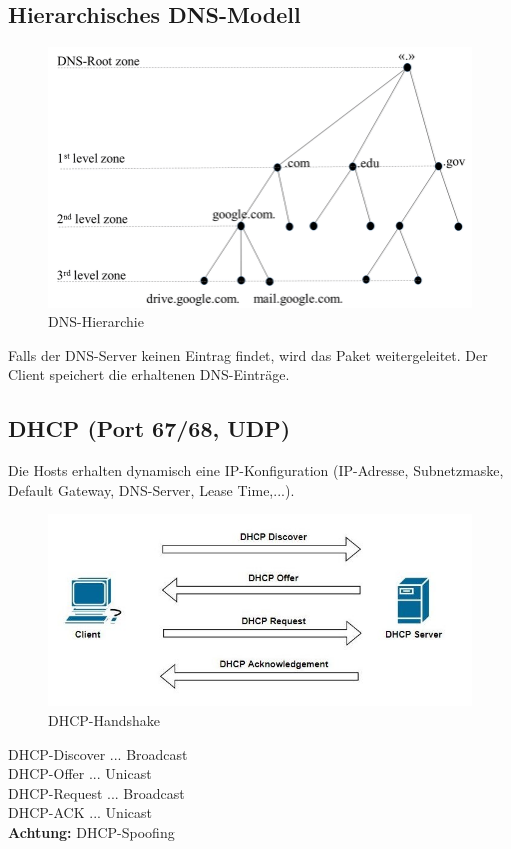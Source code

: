 \subsection*{Hierarchisches DNS-Modell}
\begin{figure}[H]
	\centering
	\includegraphics[width=0.8\linewidth]{figures/dns_hierarchy.png}
	\caption{DNS-Hierarchie}
\end{figure}
Falls der DNS-Server keinen Eintrag findet, wird das Paket weitergeleitet. Der Client speichert die erhaltenen DNS-Einträge.

\subsection*{DHCP (Port 67/68, UDP)}
Die Hosts erhalten dynamisch eine IP-Konfiguration (IP-Adresse, Subnetzmaske, Default Gateway, DNS-Server, Lease Time,...).

\begin{figure}[H]
	\centering
	\includegraphics[width=0.8\linewidth]{figures/dhcp_handshake.jpg}
	\caption{DHCP-Handshake}
\end{figure}
DHCP-Discover ... Broadcast \\
DHCP-Offer ... Unicast \\
DHCP-Request ... Broadcast \\
DHCP-ACK ... Unicast \\ 
\textbf{Achtung:} DHCP-Spoofing

